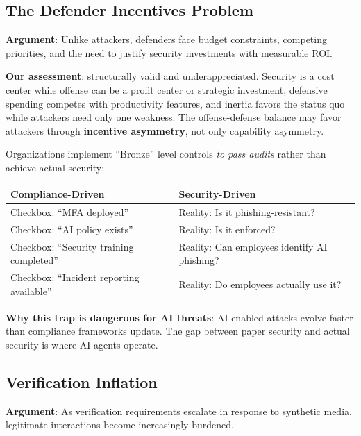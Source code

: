 \documentclass[11pt,letterpaper]{article}
\begin{document}
\subsection{The Defender Incentives Problem}

\textbf{Argument}: Unlike attackers, defenders face budget constraints, competing priorities, and the need to justify security investments with measurable ROI.

\textbf{Our assessment}: structurally valid and underappreciated. Security is a cost center while offense can be a profit center or strategic investment, defensive spending competes with productivity features, and inertia favors the status quo while attackers need only one weakness. The offense-defense balance may favor attackers through \textbf{incentive asymmetry}, not only capability asymmetry.

\begin{warnbox}
Organizations implement ``Bronze'' level controls \textit{to pass audits} rather than achieve actual security:

\begin{center}
\small
\begin{tabular}{L{5.5cm}L{6cm}}
\toprule
\textbf{Compliance-Driven} & \textbf{Security-Driven} \\
\midrule
Checkbox: ``MFA deployed'' & Reality: Is it phishing-resistant? \\
Checkbox: ``AI policy exists'' & Reality: Is it enforced? \\
Checkbox: ``Security training completed'' & Reality: Can employees identify AI phishing? \\
Checkbox: ``Incident reporting available'' & Reality: Do employees actually use it? \\
\bottomrule
\end{tabular}
\end{center}

\textbf{Why this trap is dangerous for AI threats}: AI-enabled attacks evolve faster than compliance frameworks update. The gap between paper security and actual security is where AI agents operate.
\end{warnbox}

\subsection{Verification Inflation}

\textbf{Argument}: As verification requirements escalate in response to synthetic media, legitimate interactions become increasingly burdened.
\end{document}
